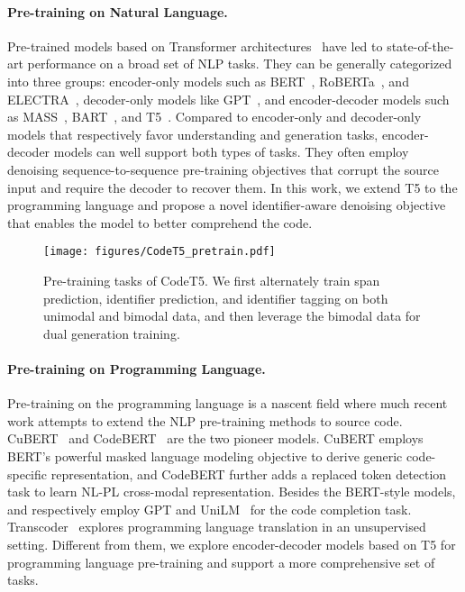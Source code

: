 \documentclass[11pt]{article}
\begin{document}
\paragraph{Pre-training on Natural Language.}
Pre-trained models based on Transformer architectures~\cite{DBLP:conf/nips/VaswaniSPUJGKP17} have led to state-of-the-art performance on a broad set of NLP tasks.
They can be generally categorized into three groups: encoder-only models such as BERT~\cite{DBLP:conf/naacl/DevlinCLT19}, RoBERTa~\cite{DBLP:journals/corr/abs-1907-11692}, and ELECTRA~\cite{DBLP:conf/iclr/ClarkLLM20}, decoder-only models like GPT~\cite{radford2019language}, and encoder-decoder models such as MASS~\cite{DBLP:conf/icml/SongTQLL19}, BART~\cite{DBLP:conf/acl/LewisLGGMLSZ20}, and T5~\cite{DBLP:journals/jmlr/RaffelSRLNMZLL20}.
Compared to encoder-only and decoder-only models that respectively favor understanding and generation tasks, encoder-decoder models can well support both types of tasks. They often employ denoising sequence-to-sequence pre-training objectives that corrupt the source input and require the decoder to recover them. 
In this work, we extend T5 to the programming language and propose a novel identifier-aware denoising objective that enables the model to better comprehend the code.

\begin{figure*}
\centering
\texttt{[image: figures/CodeT5\_pretrain.pdf]}
\vspace{-0.3em}
\caption{Pre-training tasks of CodeT5. We first alternately train span prediction, identifier prediction, and identifier tagging on both unimodal  and bimodal data, and then leverage the bimodal data for dual generation training. }\label{fig:pretrain_task}
\vspace{-0.8em}
\end{figure*}
 
\paragraph{Pre-training on Programming Language.}

Pre-training on the programming language is a nascent field where much recent work attempts to extend the NLP pre-training methods to source code. CuBERT~\cite{DBLP:conf/icml/KanadeMBS20} and CodeBERT~\cite{DBLP:conf/emnlp/FengGTDFGS0LJZ20}  are  the two pioneer models. CuBERT employs BERT's powerful masked language modeling objective to derive generic code-specific representation, and CodeBERT further adds a replaced token detection~\cite{DBLP:conf/iclr/ClarkLLM20} task to learn NL-PL cross-modal representation.
Besides the BERT-style models, \citet{DBLP:conf/sigsoft/SvyatkovskiyDFS20} and \citet{DBLP:conf/kbse/LiuLZJ20} respectively employ GPT and UniLM~\cite{DBLP:conf/nips/00040WWLWGZH19} for the code completion task.
Transcoder~\cite{DBLP:conf/nips/RoziereLCL20} explores programming language translation in an unsupervised setting.
Different from them, we explore encoder-decoder models based on T5 for programming language pre-training and support a more comprehensive set of tasks.
\end{document}
